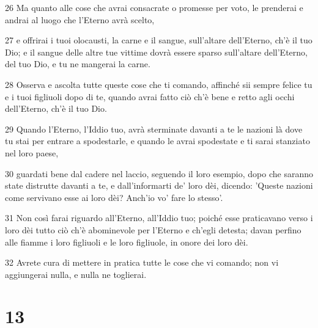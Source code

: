 \par 26 Ma quanto alle cose che avrai consacrate o promesse per voto, le prenderai e andrai al luogo che l'Eterno avrà scelto,
\par 27 e offrirai i tuoi olocausti, la carne e il sangue, sull'altare dell'Eterno, ch'è il tuo Dio; e il sangue delle altre tue vittime dovrà essere sparso sull'altare dell'Eterno, del tuo Dio, e tu ne mangerai la carne.
\par 28 Osserva e ascolta tutte queste cose che ti comando, affinché sii sempre felice tu e i tuoi figliuoli dopo di te, quando avrai fatto ciò ch'è bene e retto agli occhi dell'Eterno, ch'è il tuo Dio.
\par 29 Quando l'Eterno, l'Iddio tuo, avrà sterminate davanti a te le nazioni là dove tu stai per entrare a spodestarle, e quando le avrai spodestate e ti sarai stanziato nel loro paese,
\par 30 guardati bene dal cadere nel laccio, seguendo il loro esempio, dopo che saranno state distrutte davanti a te, e dall'informarti de' loro dèi, dicendo: 'Queste nazioni come servivano esse ai loro dèi? Anch'io vo' fare lo stesso'.
\par 31 Non così farai riguardo all'Eterno, all'Iddio tuo; poiché esse praticavano verso i loro dèi tutto ciò ch'è abominevole per l'Eterno e ch'egli detesta; davan perfino alle fiamme i loro figliuoli e le loro figliuole, in onore dei loro dèi.
\par 32 Avrete cura di mettere in pratica tutte le cose che vi comando; non vi aggiungerai nulla, e nulla ne toglierai.

\chapter{13}

